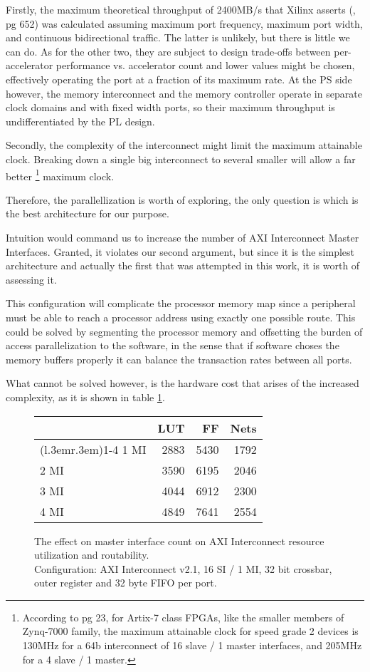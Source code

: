 Firstly, the maximum theoretical throughput of 2400MB/s that Xilinx asserts (\cite{pg585}, pg 652)
was calculated assuming maximum port frequency, maximum port width, and continuous bidirectional
traffic. The latter is unlikely, but there is little we can do. As for the other two,
they are subject to design trade-offs between per-accelerator performance vs. accelerator count
and lower values might be chosen, effectively operating the port at a fraction of its
maximum rate. At the PS side however, the memory interconnect and the memory controller
operate in separate clock domains and with fixed width ports,
so their maximum throughput is undifferentiated by the PL design.

Secondly, the complexity of the interconnect might limit the maximum attainable clock.
Breaking down a single big interconnect to several smaller will allow a far better
	\footnote{
		According to \cite{pg059} pg 23, for Artix-7 class FPGAs, 
		like the smaller members of Zynq-7000 family, the maximum attainable
		clock for speed grade 2 devices is 130MHz for a 64b interconnect of
		16 slave / 1 master interfaces, and 205MHz for a 4 slave / 1 master.
	}
maximum clock.

Therefore, the parallellization is worth of exploring, the only question is
which is the best architecture for our purpose.

Intuition would command us to increase the number of AXI Interconnect
Master Interfaces. Granted, it violates our second argument, but since
it is the simplest architecture and actually the first that was attempted
in this work, it is worth of assessing it.

This configuration will complicate the processor memory map
since a peripheral must be able to reach a processor address using
exactly one possible route. 
This could be solved by segmenting the processor memory
and offsetting the burden of access parallelization to the software,
in the sense that if software choses the memory buffers properly
it can balance the \gls{transaction} rates between all ports.

What cannot be solved however, is the hardware cost that arises of the increased
complexity, as it is shown in table \ref{tab:int-mmi}.

\begin{figure}[ht!]
\centering
\begin{tabular}{lrrr}
\toprule
	& LUT	& FF	& Nets \\
\cmidrule(l{.3em}r{.3em}){1-4}
1 MI	& 2883	& 5430	& 1792	\\
2 MI	& 3590	& 6195	& 2046	\\
3 MI	& 4044	& 6912	& 2300	\\
4 MI	& 4849	& 7641	& 2554	\\
\bottomrule
\end{tabular}
\caption{The effect on master interface count on AXI Interconnect resource utilization and routability.\\
	Configuration: AXI Interconnect v2.1, 16 SI / 1 MI, 32 bit crossbar, 
	outer register and 32 byte FIFO per port.}
\label{tab:int-mmi}
\end{figure}

